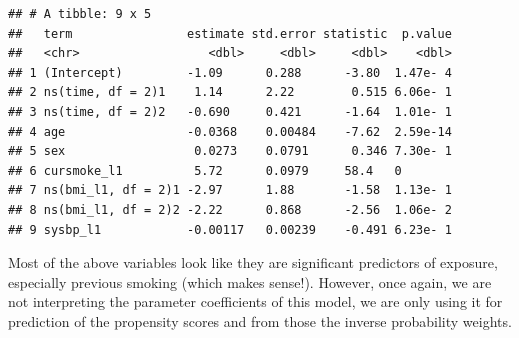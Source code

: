 \documentclass[
]{book}
\newenvironment{Shaded}{\begin{snugshade}}{\end{snugshade}}
\newcommand{\DataTypeTok}[1]{\textcolor[rgb]{0.13,0.29,0.53}{#1}}
\newcommand{\DecValTok}[1]{\textcolor[rgb]{0.00,0.00,0.81}{#1}}
\newcommand{\KeywordTok}[1]{\textcolor[rgb]{0.13,0.29,0.53}{\textbf{#1}}}
\newcommand{\NormalTok}[1]{#1}
\newcommand{\OperatorTok}[1]{\textcolor[rgb]{0.81,0.36,0.00}{\textbf{#1}}}
\newcommand{\StringTok}[1]{\textcolor[rgb]{0.31,0.60,0.02}{#1}}
\begin{document}
\begin{Shaded}
\end{Shaded}

\begin{verbatim}
## # A tibble: 9 x 5
##   term                estimate std.error statistic  p.value
##   <chr>                  <dbl>     <dbl>     <dbl>    <dbl>
## 1 (Intercept)         -1.09      0.288      -3.80  1.47e- 4
## 2 ns(time, df = 2)1    1.14      2.22        0.515 6.06e- 1
## 3 ns(time, df = 2)2   -0.690     0.421      -1.64  1.01e- 1
## 4 age                 -0.0368    0.00484    -7.62  2.59e-14
## 5 sex                  0.0273    0.0791      0.346 7.30e- 1
## 6 cursmoke_l1          5.72      0.0979     58.4   0       
## 7 ns(bmi_l1, df = 2)1 -2.97      1.88       -1.58  1.13e- 1
## 8 ns(bmi_l1, df = 2)2 -2.22      0.868      -2.56  1.06e- 2
## 9 sysbp_l1            -0.00117   0.00239    -0.491 6.23e- 1
\end{verbatim}

Most of the above variables look like they are significant predictors of exposure, especially previous smoking (which makes sense!). However, once again, we are not interpreting the parameter coefficients of this model, we are only using it for prediction of the propensity scores and from those the inverse probability weights.
\end{document}
